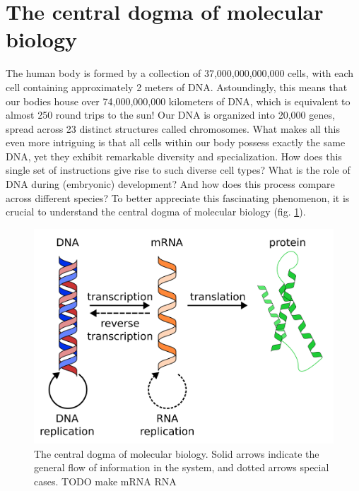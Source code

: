 \section{The central dogma of molecular biology}

The human body is formed by a collection of 37,000,000,000,000 cells\cite{Bianconi2013}, with each cell containing approximately 2 meters of DNA. Astoundingly, this means that our bodies house over 74,000,000,000 kilometers of DNA, which is equivalent to almost 250 round trips to the sun! Our DNA is organized into 20,000 genes, spread across 23 distinct structures called chromosomes. What makes all this even more intriguing is that all cells within our body possess exactly the same DNA, yet they exhibit remarkable diversity and specialization. How does this single set of instructions give rise to such diverse cell types? What is the role of DNA during (embryonic) development? And how does this process compare across different species? To better appreciate this fascinating phenomenon, it is crucial to understand the central dogma of molecular biology (fig. \ref{fig:central_dogma}).

\begin{figure}[H]
    \includegraphics[width=\linewidth]{ch1.Introduction/imgs/central_dogma.png}
    \caption{The central dogma of molecular biology. Solid arrows indicate the general flow of information in the system, and dotted arrows special cases. TODO make mRNA RNA }
    \label{fig:central_dogma}
\end{figure}

